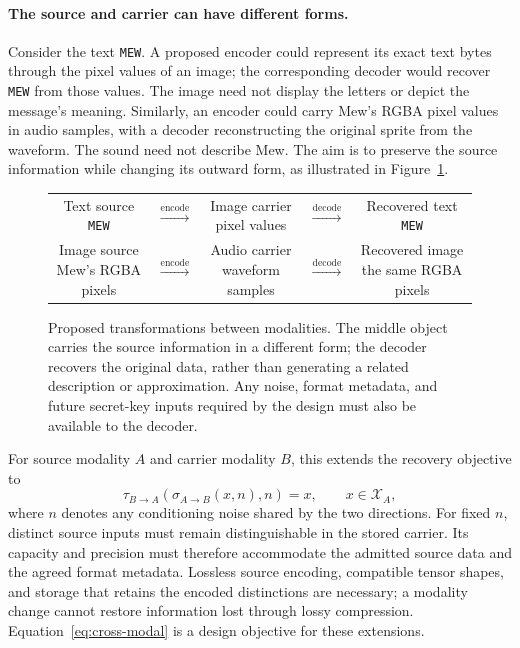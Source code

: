 \documentclass[10pt]{article}
\begin{document}
\paragraph{The source and carrier can have different forms.}
Consider the text \texttt{MEW}. A proposed encoder could represent its exact
text bytes through the pixel values of an image; the corresponding decoder
would recover \texttt{MEW} from those values. The image need not display the
letters or depict the message's meaning. Similarly, an encoder could carry
Mew's RGBA pixel values in audio samples, with a decoder reconstructing the
original sprite from the waveform. The sound need not describe Mew. The aim
is to preserve the source information while changing its outward form, as
illustrated in Figure~\ref{fig:cross-modal}.

\begin{figure}[!htbp]
\centering
\renewcommand{\arraystretch}{1.8}
\begin{tabular}{ccccc}
\shortstack{Text source\\\texttt{MEW}} & $\xrightarrow{\text{encode}}$ &
\shortstack{Image carrier\\pixel values} & $\xrightarrow{\text{decode}}$ &
\shortstack{Recovered text\\\texttt{MEW}} \\
\shortstack{Image source\\Mew's RGBA pixels} & $\xrightarrow{\text{encode}}$ &
\shortstack{Audio carrier\\waveform samples} & $\xrightarrow{\text{decode}}$ &
\shortstack{Recovered image\\the same RGBA pixels}
\end{tabular}
\caption{Proposed transformations between modalities. The middle object carries
the source information in a different form; the decoder recovers the original
data, rather than generating a related description or approximation. Any noise,
format metadata, and future secret-key inputs required by the design must also
be available to the decoder.}
\label{fig:cross-modal}
\end{figure}

For source modality $A$ and carrier modality $B$, this extends the recovery
objective to
\begin{equation}
 \tau_{B\to A}(\sigma_{A\to B}(x,n),n)=x,\qquad x\in\mathcal X_A,
 \label{eq:cross-modal}
\end{equation}
where $n$ denotes any conditioning noise shared by the two directions. For
fixed $n$, distinct source inputs must remain distinguishable in the stored
carrier. Its capacity and precision must therefore accommodate the admitted
source data and the agreed format metadata. Lossless source encoding, compatible
tensor shapes, and storage that retains the encoded distinctions are necessary;
a modality change cannot restore information lost through lossy compression.
Equation~\ref{eq:cross-modal} is a design objective for these extensions.
\end{document}
